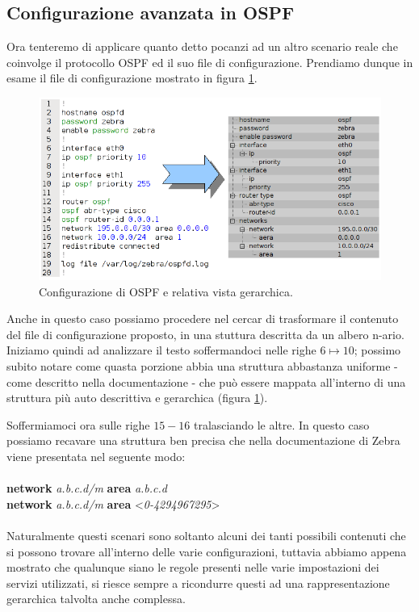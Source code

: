 \subsection{Configurazione avanzata in OSPF}
Ora tenteremo di applicare quanto detto pocanzi ad un altro scenario reale che coinvolge il protocollo OSPF ed il suo file di configurazione. Prendiamo dunque in esame il file di configurazione mostrato in figura \ref{figura:ospf_conf}.

\begin{figure}[!htb]
	\centering
	\includegraphics[width=12cm]{images/ospf_conf_schema_tree.png}
	\caption{Configurazione di OSPF e relativa vista gerarchica.}
	\label{figura:ospf_conf}
\end{figure}

Anche in questo caso possiamo procedere nel cercar di trasformare il contenuto del file di configurazione proposto, in una stuttura descritta da un albero n-ario. Iniziamo quindi ad analizzare il testo soffermandoci nelle righe $6\mapsto10$; possimo subito notare come quasta porzione abbia una struttura abbastanza uniforme - come descritto nella documentazione\cite{ZEBRADOC} - che può essere mappata all'interno di una struttura più auto descrittiva e gerarchica (figura \ref{figura:ospf_conf}).

Soffermiamoci ora sulle righe $15-16$ tralasciando le altre. In questo caso possiamo recavare una struttura ben precisa che nella documentazione di Zebra viene presentata nel seguente modo:
\\
\\
\textbf{network} \textit{a.b.c.d/m} \textbf{area} \textit{a.b.c.d}
\\
\textbf{network} \textit{a.b.c.d/m} \textbf{area} <\textit{0-4294967295}>
\\
\\
Naturalmente questi scenari sono soltanto alcuni dei tanti possibili contenuti che si possono trovare all'interno delle varie configurazioni, tuttavia abbiamo appena mostrato che qualunque siano le regole presenti nelle varie impostazioni dei servizi utilizzati, si riesce sempre a ricondurre questi ad una rappresentazione gerarchica talvolta anche complessa.

